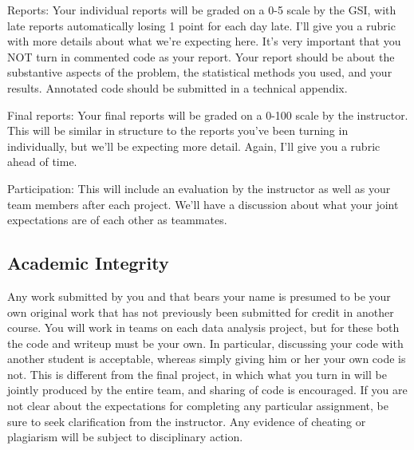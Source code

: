 \documentclass[11pt]{article}
\begin{document}
Reports: Your individual reports will be graded on a 0-5 scale by the GSI, with late reports automatically losing 1 point for each day late. I'll give you a rubric with more details about what we're expecting here. It's very important that you NOT turn in commented code as your report. Your report should be about the substantive aspects of the problem, the statistical methods you used, and your results. Annotated code should be submitted in a technical appendix.

Final reports: Your final reports will be graded on a 0-100 scale by the instructor. This will be similar in structure to the reports you've been turning in individually, but we'll be expecting more detail. Again, I'll give you a rubric ahead of time.

Participation: This will include an evaluation by the instructor as well as your team members after each project. We'll have a discussion about what your joint expectations are of each other as teammates.

\subsection*{Academic Integrity} Any work submitted by you and that bears your name is presumed to be your own original work that has not previously been submitted for credit in another course. You will work in teams on each data analysis project, but for these both the code and writeup must be your own.  In particular, discussing your code with another student is acceptable, whereas simply giving him or her your own code is not.  This is different from the final project, in which what you turn in will be jointly produced by the entire team, and sharing of code is encouraged. If you are not clear about the expectations for completing any particular assignment, be sure to seek clarification from the instructor.  Any evidence of cheating or plagiarism will be subject to disciplinary action.
\end{document}
